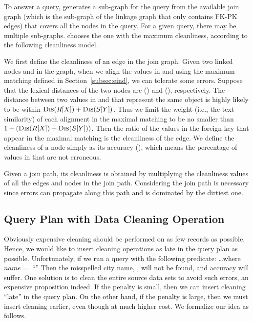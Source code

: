 To answer a query, \dcv generates a sub-graph for the query from the available join graph (which is the sub-graph of the linkage graph that only contains FK-PK edges) that covers all the nodes in the query. 
For a given query, there may be multiple sub-graphs. 
\dcv chooses the one with the maximum cleanliness, according to the following cleanliness model.


We first define the cleanliness of an edge in the join graph. 
Given two linked nodes \RX and \SY in the graph, when we align the values in \RX and \SY using the maximum matching  defined in Section~\ref{subsec:eind}, we can tolerate some errors. Suppose that the lexical distances of the two nodes are \Dis(\RX) and \Dis(\SY), respectively. The distance between two values in \RX and \SY that represent the same object is highly likely to be within $\textsc{Dis}(R[X]) + \textsc{Dis}(S[Y])$. Thus we limit the weight (i.e., the text similarity) of each alignment in the maximal matching to be no smaller than $1-(\textsc{Dis}(R[X])+\textsc{Dis}(S[Y]))$. 
Then the ratio of the values in the foreign key that appear in the maximal matching is the cleanliness of the edge. We define the cleanliness of a node \RX simply as its accuracy \Acc(\RX), which means the percentage of values in \RX that are not erroneous.

Given a join path, its cleanliness is obtained by multiplying the cleanliness values of all the edges and nodes in the join path. Considering the join path is necessary since errors can propagate along this path and is dominated by the dirtiest one.



\subsection{Query Plan with Data Cleaning Operation}
\label{subsec:gain}

Obviously expensive cleaning should be performed on as few records as possible. Hence, we would like to insert cleaning operations as late in the query plan as possible. 
Unfortunately, if we run a query with the following predicate:
\vspace{.5em}
\dots \textsf{where} $name = $ ``''
\vspace{.5em}
\noindent Then the misspelled city name,  \ie {}, will not be found, and accuracy will suffer. One solution is to clean the entire source data sets to avoid such errors, an expensive proposition indeed. If the penalty is small, then we can insert cleaning ``late'' in the query plan. On the other hand, if the penalty is large, then we must insert cleaning earlier, even though at much higher cost. We formalize our idea as follows.


